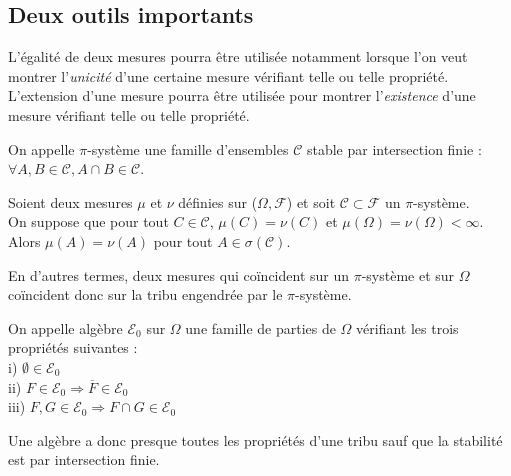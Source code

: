 \documentclass[landscape,twocolumn]{article}
\begin{document}
\subsection{Deux outils importants}

\begin{expli}
L'égalité de deux mesures pourra être utilisée notamment lorsque l'on veut montrer l'\textit{unicité} d'une certaine mesure vérifiant telle ou telle propriété. \\
L'extension d'une mesure pourra être utilisée pour montrer l'\textit{existence} d'une mesure vérifiant telle ou telle propriété.
\end{expli}

\begin{defin}[$\pi$-système]
On appelle $\pi$-système une famille d'ensembles $\mathcal{C}$ stable par intersection finie : $\forall A, B \in \mathcal{C}, A \cap B \in \mathcal{C}$.
\end{defin}

\begin{theo}
Soient deux mesures $\mu$ et $\nu$ définies sur ($\Omega, \mathcal{F}$) et soit $\mathcal{C} \subset \mathcal{F}$ un $\pi$-système. \\
On suppose que pour tout $C \in \mathcal{C}$, $\mu (C) = \nu (C)$ et $\mu (\Omega) = \nu (\Omega) < \infty$. \\
Alors $\mu (A) = \nu (A)$ pour tout $A \in \sigma(\mathcal{C})$.
\end{theo}

\begin{expli}
En d'autres termes, deux mesures qui coïncident sur un $\pi$-système et sur $\Omega$ coïncident donc sur la tribu engendrée par le $\pi$-système.
\end{expli}


\begin{defin}[Algèbre]
On appelle algèbre $\mathcal{E}_0$ sur $\Omega$ une famille de parties de $\Omega$ vérifiant les trois propriétés suivantes : \\
i) $\emptyset \in \mathcal{E}_0$ \\
ii) $F \in \mathcal{E}_0 \Longrightarrow \overline{F} \in \mathcal{E}_0$ \\
iii) $F, G \in \mathcal{E}_0 \Longrightarrow F \cap G \in \mathcal{E}_0$
\end{defin}

\begin{expli}
Une algèbre a donc presque toutes les propriétés d'une tribu sauf que la stabilité est par intersection finie.
\end{expli}
\end{document}
